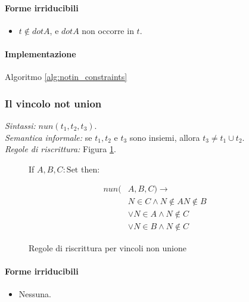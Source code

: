 \documentclass[12pt,a4paper,openright]{book} %
\begin{document}
\paragraph{Forme irriducibili}
\begin{itemize}
	\item $t \not\in dotA$, e $dotA$ non occorre in $t$.
\end{itemize}

\paragraph{Implementazione}
Algoritmo \ref{alg:notin_constraints}

\subsubsection{Il vincolo not union}

\textit{Sintassi:} $nun(t_1,t_2,t_3)$.\\
\noindent\textit{Semantica informale:} se $t_1, t_2$ e $t_3$ sono insiemi, allora $t_3 \neq t_1 \cup t_2$.\\
\noindent\textit{Regole di riscrittura:} Figura \ref{fig:notun_constraints}.

\begin{figure}
	\begin{tcolorbox}[colframe=black, colback=white, sharp corners]
		\setcounter{equation}{13}
		\renewcommand{\theequation}{$\cup$\textsubscript{\arabic{equation}}}

		If $A, B, C: \text{Set}$ then:

		\begin{equation}
		\begin{split}
		nun(& A,B,C) \to \\
		  & N \in C \land N \not\in A N \not\in B \\
		  & \lor N \in A \land N \not\in C \\
		  & \lor N \in B \land N \not\in C
		\end{split}
		\end{equation}

	\end{tcolorbox}

	\caption{Regole di riscrittura per vincoli non unione}
	\label{fig:notun_constraints}
\end{figure}

\paragraph{Forme irriducibili}
\begin{itemize}
	\item Nessuna.
\end{itemize}
\end{document}
